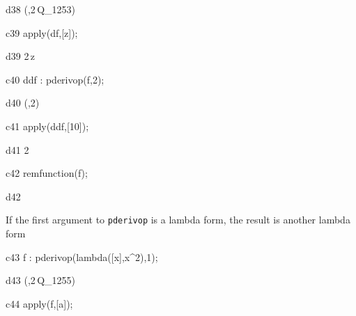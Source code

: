 \documentclass[12pt]{article}
\begin{document}
\begin{mdline}{d38}
   \lambda\left(\left[ Q_{1253} \right] ,2\,Q_{1253}\right)
\end{mdline}

\begin{mcline}{c39}
   apply(df,[z]);
\end{mcline}



\begin{mdline}{d39}
   2\,z
\end{mdline}

\begin{mcline}{c40}
   ddf : pderivop(f,2);
\end{mcline}



\begin{mdline}{d40}
   \lambda\left(\left[ Q_{1254} \right] ,2\right)
\end{mdline}

\begin{mcline}{c41}
   apply(ddf,[10]);
\end{mcline}



\begin{mdline}{d41}
   2
\end{mdline}

\begin{mcline}{c42}
   remfunction(f);
\end{mcline}



\begin{mdline}{d42}
   \left[ f \right] 
\end{mdline}


If the first argument to {\tt pderivop} is a lambda form, the
result is another lambda form



\begin{mcline}{c43}
     f : pderivop(lambda([x],x^2),1);
\end{mcline}



\begin{mdline}{d43}
   \lambda\left(\left[ Q_{1255} \right] ,2\,Q_{1255}\right)
\end{mdline}

\begin{mcline}{c44}
   apply(f,[a]);
\end{mcline}
\end{document}
